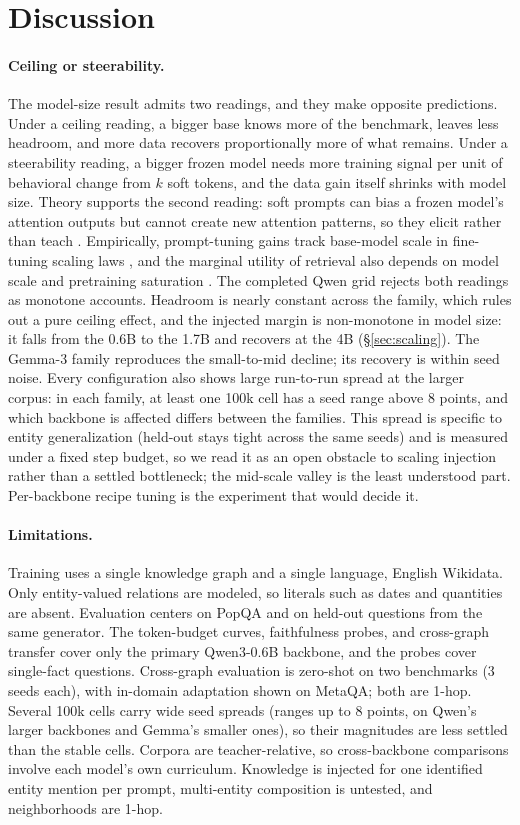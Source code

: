 \documentclass{article}
\newcommand{\popqa}{PopQA}
\begin{document}
\section{Discussion}

\paragraph{Ceiling or steerability.} The model-size result admits two readings, and they make
opposite predictions. Under a ceiling reading, a bigger base knows more of the benchmark,
leaves less headroom, and more data recovers proportionally more of what remains. Under a
steerability reading, a bigger frozen model needs more training signal per unit of behavioral
change from $k$ soft tokens, and the data gain itself shrinks with model size. Theory
supports the second reading: soft prompts can bias a frozen model's attention outputs but
cannot create new attention patterns, so they elicit rather than teach \citep{petrov}.
Empirically, prompt-tuning gains track base-model scale in fine-tuning scaling laws
\citep{scalingft}, and the marginal utility of retrieval also depends on model scale and
pretraining saturation \citep{memorizeretrieve}. The completed Qwen grid rejects both readings as
monotone accounts. Headroom is nearly constant across the family, which rules out a pure
ceiling effect, and the injected margin is non-monotone in model size: it falls from the 0.6B
to the 1.7B and recovers at the 4B (\S\ref{sec:scaling}). The Gemma-3 family reproduces the
small-to-mid decline; its recovery is within seed noise. Every configuration also shows large
run-to-run spread at the larger corpus: in each family, at least one 100k cell has a seed range
above 8 points, and which backbone is affected differs between the families. This spread is
specific to entity generalization (held-out stays tight across the same seeds) and is measured
under a fixed step budget, so we read it as an open obstacle to scaling injection rather than a
settled bottleneck; the mid-scale valley is the least understood part. Per-backbone recipe
tuning is the experiment that would decide it.

\paragraph{Limitations.} Training uses a single knowledge graph and a single language,
English Wikidata. Only entity-valued relations are modeled, so literals such as dates and
quantities are absent. Evaluation centers on \popqa{} and on held-out questions from the same
generator. The token-budget curves, faithfulness probes, and cross-graph transfer cover only
the primary Qwen3-0.6B backbone, and the probes cover single-fact questions. Cross-graph
evaluation is zero-shot on two benchmarks (3 seeds each), with in-domain adaptation shown on
MetaQA; both are 1-hop. Several 100k cells carry wide seed spreads (ranges up to 8 points, on Qwen's
larger backbones and Gemma's smaller ones), so their magnitudes are less settled than the
stable cells. Corpora are teacher-relative, so cross-backbone comparisons
involve each model's own curriculum. Knowledge is injected for one identified entity mention
per prompt, multi-entity composition is untested, and neighborhoods are 1-hop.
\end{document}
